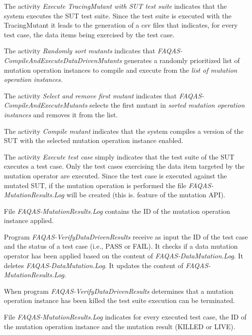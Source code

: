\RQ{} The activity \emph{Execute TracingMutant with SUT test suite} indicates that the system executes the SUT test suite. Since the test suite is executed with the TracingMutant it leads to the generation of a csv files that indicates, for every test case, the data items being exercised by the test case.

\RQ{} The activity \emph{Randomly sort mutants} indicates that  \emph{FAQAS-CompileAndExecuteDataDrivenMutants} generates a randomly prioritized list of mutation operation instances to compile and execute from the \emph{list of mutation operation instances}.

\RQ{} The activity \emph{Select and remove first mutant} indicates that  \emph{FAQAS-CompileAndExecuteMutants} selects the first mutant in \emph{sorted mutation operation instances} and removes it from the list.

\RQ{} The activity \emph{Compile mutant} indicates that the system compiles a version of the SUT with the selected mutation operation instance enabled.

\RQ{} The activity \emph{Execute test case} simply indicates that the test suite of the SUT executes a test case. Only the test cases exercising the data item targeted by the mutation operator are executed. Since the test case is executed against the mutated SUT, if the mutation operation is performed the file \emph{FAQAS-MutationResults.Log} will be created (this is. feature of the mutation API).

\RQ{}File \emph{FAQAS-MutationResults.Log} contains the ID of the mutation operation instance applied.

\RQ{} Program \emph{FAQAS-VerifyDataDrivenResults} receive as input the ID of the test case and  the status of a test case (i.e., PASS or FAIL). It checks if a data mutation operator has been applied based on the content of \emph{FAQAS-DataMutation.Log}. It deletes \emph{FAQAS-DataMutation.Log}. It updates the content of \emph{FAQAS-MutationResults.Log}.

\RQ{} When program \emph{FAQAS-VerifyDataDrivenResults} determines that a mutation operation instance has been killed the test suite execution can be terminated.

\RQ{} File \emph{FAQAS-MutationResults.Log} indicates for every executed test case, the ID of the mutation operation instance and the mutation result (KILLED or LIVE).

